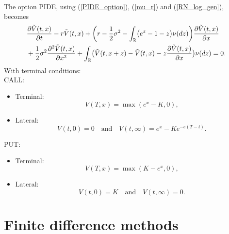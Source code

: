 The option PIDE, using (\ref{PIDE_option}), (\ref{mu=r}) and (\ref{RN_log_gen}), becomes 
\begin{align}\label{PIDE_log}
&  \frac{\partial \tilde V(t,x)}{\partial t} - r \tilde V(t,x) 
          + \biggl( r -\frac{1}{2}\sigma^2 - \int_{\mathbb{R}} \bigl( e^z-1-z \bigr) \nu(dz) \biggr) \frac{\partial \tilde V(t,x)}{\partial x} \\ \nonumber
          &+ \frac{1}{2} \sigma^2 \frac{\partial^2 \tilde V(t,x)}{\partial x^2} 
          + \int_{\mathbb{R}} \bigl( \tilde V(t,x+z)- \tilde V(t,x) - z \frac{\partial \tilde V(t,x)}{\partial x} \bigr) \nu(dz)  = 0.
\end{align}
With terminal conditions:\\
CALL:
\begin{itemize}
 \item Terminal:
 $$ V(T,x) = \max(e^x-K,0), $$
 \item Lateral:
 $$ V(t,0) = 0 \quad \mbox{and} \quad V(t, \infty) = e^x - Ke^{-e(T-t)}. $$
\end{itemize}
PUT:
\begin{itemize}
 \item Terminal:
 $$ V(T,x) = \max(K-e^x,0), $$
 \item Lateral:
 $$ V(t,0) = K \quad \mbox{and} \quad V(t, \infty) = 0. $$
\end{itemize}


\section{Finite difference methods}


